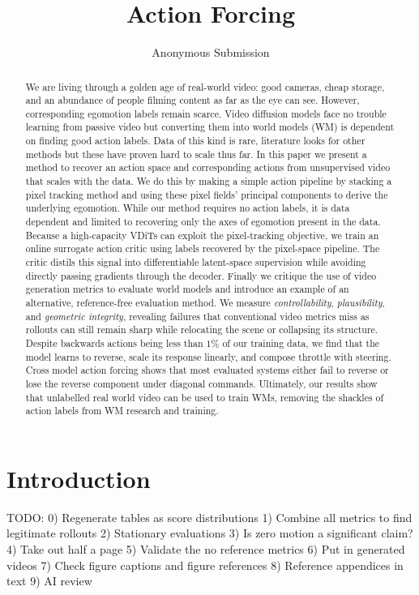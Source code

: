\documentclass[letterpaper]{article} %
\title{Action Forcing}
\author{
    Anonymous Submission
}
\begin{document}
\maketitle

\begin{abstract}
We are living through a golden age of real-world video: good cameras, cheap storage, and an abundance of people filming content as far as the eye can see. However, corresponding egomotion labels remain scarce. Video diffusion models face no trouble learning from passive video but converting them into world models (WM) is dependent on finding good action labels. Data of this kind is rare, literature looks for other methods but these have proven hard to scale thus far. In this paper we present a method to recover an action space and corresponding actions from unsupervised video that scales with the data. 
We do this by making a simple action pipeline by stacking a pixel tracking method and using these pixel fields' principal components to derive the underlying egomotion.
While our method requires no action labels, it is data dependent and limited to recovering only the axes of egomotion present in the data. Because a high-capacity VDiTs can exploit the pixel-tracking objective, we train an online surrogate action critic using labels recovered by the pixel-space pipeline. The critic distils this signal into differentiable latent-space supervision while avoiding directly passing gradients through the decoder.
Finally we critique the use of video generation metrics to evaluate world models and introduce an example of an alternative, reference-free evaluation method. We measure \textit{controllability}, \textit{plausibility}, and \textit{geometric integrity}, revealing failures that conventional video metrics miss as rollouts can still remain sharp while relocating the scene or collapsing its structure.
Despite backwards actions being less than $1\%$ of our training data, we find that the model learns to reverse, scale its response linearly, and compose throttle with steering. Cross model action forcing shows that most evaluated systems either fail to reverse or lose the reverse component under diagonal commands. 
Ultimately, our results show that unlabelled real world video can be used to train WMs, removing the shackles of action labels from WM research and training.
\end{abstract}

\section{Introduction}
TODO:
0) Regenerate tables as score distributions
1) Combine all metrics to find legitimate rollouts
2) Stationary evaluations
3) Is zero motion a significant claim?
4) Take out half a page
5) Validate the no reference metrics
6) Put in generated videos
7) Check figure captions and figure references
8) Reference appendices in text
9) AI review
\end{document}

